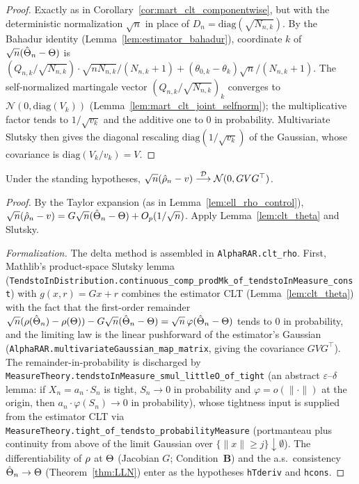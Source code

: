 \begin{proof}\leanok
{}
Exactly as in Corollary~\ref{cor:mart_clt_componentwise}, but with the deterministic
normalization $\sqrt n$ in place of $D_n=\mathrm{diag}(\sqrt{N_{n,k}})$. By the Bahadur
identity (Lemma~\ref{lem:estimator_bahadur}), coordinate $k$ of
$\sqrt n(\hat{\Theta}_n-\Theta)$ is
$(Q_{n,k}/\sqrt{N_{n,k}})\cdot\sqrt{nN_{n,k}}/(N_{n,k}+1)
 + (\theta_{0,k}-\theta_k)\sqrt n/(N_{n,k}+1)$. The self-normalized martingale vector
$(Q_{n,k}/\sqrt{N_{n,k}})_k$ converges to $\mathcal N(0,\mathrm{diag}(V_k))$
(Lemma~\ref{lem:mart_clt_joint_selfnorm}); the multiplicative factor tends to $1/\sqrt{v_k}$ and
the additive one to $0$ in probability. Multivariate Slutsky then gives the diagonal rescaling
$\mathrm{diag}(1/\sqrt{v_k})$ of the Gaussian, whose covariance is $\mathrm{diag}(V_k/v_k)=V$.
\end{proof}

\begin{lemma}\label{lem:clt_rho}
\leanok
{}
Under the standing hypotheses, $\sqrt n(\hat{\rho}_n - v)\overset{\mathcal{D}}{\longrightarrow}\mathcal{N}(0,GVG^\top)$.
\end{lemma}

\begin{proof}\leanok
{}
By the Taylor expansion (as in Lemma~\ref{lem:ell_rho_control}),
$\sqrt n(\hat{\rho}_n-v)=G\sqrt n(\hat{\Theta}_n-\Theta)+O_p(1/\sqrt n)$. Apply
Lemma~\ref{lem:clt_theta} and Slutsky.

\emph{Formalization.} The delta method is assembled in
\texttt{AlphaRAR.clt\_rho}. First, Mathlib's product-space Slutsky lemma
(\texttt{TendstoInDistribution.continuous\_comp\_prodMk\_of\_tendstoInMeasure\_const}) with
$g(x,r)=Gx+r$ combines the estimator
CLT (Lemma~\ref{lem:clt_theta}) with the fact that the first-order remainder
$\sqrt n(\rho(\hat{\Theta}_n)-\rho(\Theta))-G\sqrt n(\hat{\Theta}_n-\Theta)=\sqrt n\,\varphi(\hat{\Theta}_n-\Theta)$
tends to $0$ in probability, and the limiting law is the linear pushforward of the estimator's Gaussian
(\texttt{AlphaRAR.multivariateGaussian\_map\_matrix}, giving the covariance $GVG^\top$). The
remainder-in-probability is discharged by \texttt{MeasureTheory.tendstoInMeasure\_smul\_littleO\_of\_tight}
(an abstract $\varepsilon$--$\delta$ lemma: if $X_n=a_n\cdot S_n$ is tight, $S_n\to0$ in probability and
$\varphi=o(\|\cdot\|)$ at the origin, then $a_n\cdot\varphi(S_n)\to0$ in probability), whose tightness
input is supplied from the estimator CLT via
\texttt{MeasureTheory.tight\_of\_tendsto\_probabilityMeasure} (portmanteau plus continuity from above of
the limit Gaussian over $\{\|x\|\ge j\}\downarrow\emptyset$). The differentiability of $\rho$ at
$\Theta$ (Jacobian $G$; Condition~\textbf{B}) and the a.s.\ consistency $\hat{\Theta}_n\to\Theta$
(Theorem~\ref{thm:LLN}) enter as the hypotheses \texttt{hTderiv} and \texttt{hcons}.
\end{proof}


